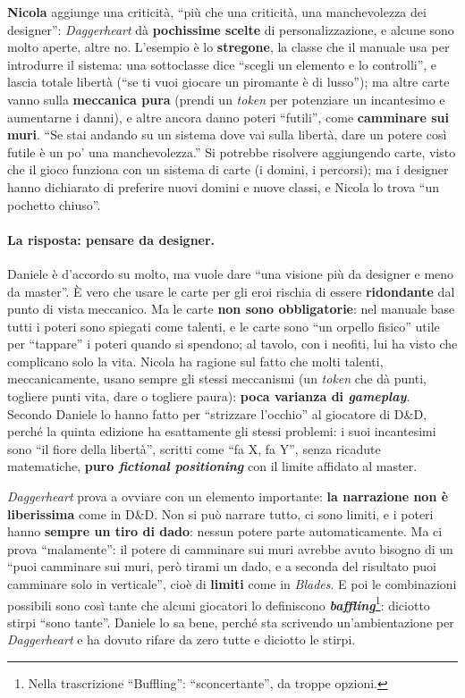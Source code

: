 \textbf{Nicola} aggiunge una criticità, ``più che una criticità, una manchevolezza dei designer'':
\emph{Daggerheart} dà \textbf{pochissime scelte} di personalizzazione, e alcune sono molto aperte,
altre no. L'esempio è lo \textbf{stregone}, la classe che il manuale usa per introdurre il sistema: una
sottoclasse dice ``scegli un elemento e lo controlli'', e lascia totale libertà (``se ti vuoi giocare un
piromante è di lusso''); ma altre carte vanno sulla \textbf{meccanica pura} (prendi un \emph{token} per
potenziare un incantesimo e aumentarne i danni), e altre ancora danno poteri ``futili'', come
\textbf{camminare sui muri}. ``Se stai andando su un sistema dove vai sulla libertà, dare un potere così
futile è un po' una manchevolezza.'' Si potrebbe risolvere aggiungendo carte, visto che il gioco
funziona con un sistema di carte (i domini, i percorsi); ma i designer hanno dichiarato di preferire
nuovi domini e nuove classi, e Nicola lo trova ``un pochetto chiuso''.

\paragraph{La risposta: pensare da designer.} Daniele è d'accordo su molto, ma vuole dare ``una visione
più da designer e meno da master''. È vero che usare le carte per gli eroi rischia di essere
\textbf{ridondante} dal punto di vista meccanico. Ma le carte \textbf{non sono obbligatorie}: nel
manuale base tutti i poteri sono spiegati come talenti, e le carte sono ``un orpello fisico'' utile per
``tappare'' i poteri quando si spendono; al tavolo, con i neofiti, lui ha visto che complicano solo la
vita. Nicola ha ragione sul fatto che molti talenti, meccanicamente, usano sempre gli stessi meccanismi
(un \emph{token} che dà punti, togliere punti vita, dare o togliere paura): \textbf{poca varianza di
\emph{gameplay}}. Secondo Daniele lo hanno fatto per ``strizzare l'occhio'' al giocatore di D\&D,
perché la quinta edizione ha esattamente gli stessi problemi: i suoi incantesimi sono ``il fiore della
libertà'', scritti come ``fa X, fa Y'', senza ricadute matematiche, \textbf{puro \emph{fictional
positioning}} con il limite affidato al master.

\emph{Daggerheart} prova a ovviare con un elemento importante: \textbf{la narrazione non è liberissima}
come in D\&D. Non si può narrare tutto, ci sono limiti, e i poteri hanno \textbf{sempre un tiro di
dado}: nessun potere parte automaticamente. Ma ci prova ``malamente'': il potere di camminare sui muri
avrebbe avuto bisogno di un ``puoi camminare sui muri, però tirami un dado, e a seconda del risultato
puoi camminare solo in verticale'', cioè di \textbf{limiti} come in \emph{Blades}. E poi le combinazioni
possibili sono così tante che alcuni giocatori lo definiscono \textbf{\emph{baffling}}\footnote{Nella
trascrizione ``Buffling'': ``sconcertante'', da troppe opzioni.}: diciotto stirpi ``sono tante''. Daniele
lo sa bene, perché sta scrivendo un'ambientazione per \emph{Daggerheart} e ha dovuto rifare da zero tutte
e diciotto le stirpi.

